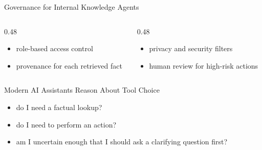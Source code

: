 \documentclass[aspectratio=169]{beamer}
\newcommand{\defaultdeckrefs}{AIMA4e Ch.10 pp.314--343; Poole3e Ch.16 pp.701--730}
\newcommand{\currentsliderefs}{\defaultdeckrefs}
\newcommand{\setslideref}[1]{\gdef\currentsliderefs{#1}}
\begin{document}
\setslideref{AIMA4e Ch.10 pp.314--343; Poole3e Ch.16 pp.701--730}
\begin{frame}{Governance for Internal Knowledge Agents}
\begin{columns}[T,onlytextwidth]
  \begin{column}{0.48\textwidth}
    \begin{itemize}
      \item role-based access control
      \item provenance for each retrieved fact
    \end{itemize}
  \end{column}
  \begin{column}{0.48\textwidth}
    \begin{itemize}
      \item privacy and security filters
      \item human review for high-risk actions
    \end{itemize}
  \end{column}
\end{columns}
\end{frame}

\setslideref{AIMA4e Ch.10 pp.314--343; Poole3e Ch.16 pp.701--730; https://modelcontextprotocol.io/specification/; https://openai.github.io/openai-agents-python/}
\begin{frame}{Modern AI Assistants Reason About Tool Choice}
\begin{itemize}
  \item do I need a factual lookup?
  \item do I need to perform an action?
  \item am I uncertain enough that I should ask a clarifying question first?
\end{itemize}
\end{frame}
\end{document}
